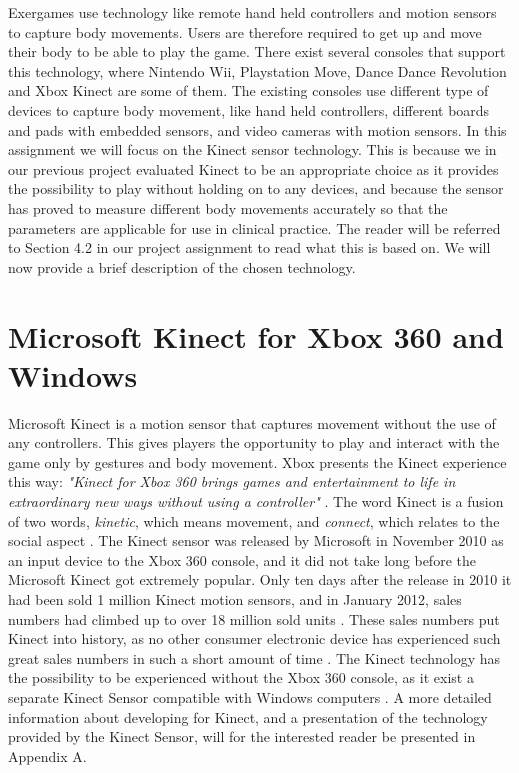 Exergames use technology like remote hand held controllers and motion sensors to capture body movements. Users are therefore required to get up and move their body to be able to play the game. There exist several consoles that support this technology, where Nintendo Wii, Playstation Move, Dance Dance Revolution and Xbox Kinect are some of them. The existing consoles use different type of devices to capture body movement, like hand held controllers, different boards and pads with embedded sensors, and video cameras with motion sensors. In this assignment we will focus on the Kinect sensor technology. This is because we in our previous project evaluated Kinect to be an appropriate choice as it provides the possibility to play without holding on to any devices, and because the sensor has proved to measure different body movements accurately so that the parameters are applicable for use in clinical practice. The reader will be referred to Section 4.2 in our project assignment \cite{project} to read what this is based on. We will now provide a brief description of the chosen technology.

\section{Microsoft Kinect for Xbox 360 and Windows}
\label{sec:xbox}
Microsoft Kinect is a motion sensor that captures movement without the use of any controllers. This gives players the opportunity to play and interact with the game only by gestures and body movement. Xbox presents the Kinect experience this way: \emph{"Kinect for Xbox 360 brings games and entertainment to life in extraordinary new ways without using a controller"} \cite{kinectxboxdef}. The word Kinect is a fusion of two words, \emph{kinetic}, which means movement, and \emph{connect}, which relates to the social aspect \cite{howstuffworksKinect}. The Kinect sensor was released by Microsoft in November 2010 as an input device to the Xbox 360 console, and it did not take long before the Microsoft Kinect got extremely popular. Only ten days after the release in 2010 it had been sold 1 million Kinect motion sensors, and in January 2012, sales numbers had climbed up to over 18 million sold units \cite{kinectsales}. These sales numbers put Kinect into history, as no other consumer electronic device has experienced such great sales numbers in such a short amount of time  \cite{kinectsales} \cite{microsoftnews}. The Kinect technology has the possibility to be experienced without the Xbox 360 console, as it exist a separate Kinect Sensor compatible with Windows computers \cite{kinectforwindows}. A more detailed information about developing for Kinect, and a presentation of the technology provided by the Kinect Sensor, will for the interested reader be presented in Appendix A.

